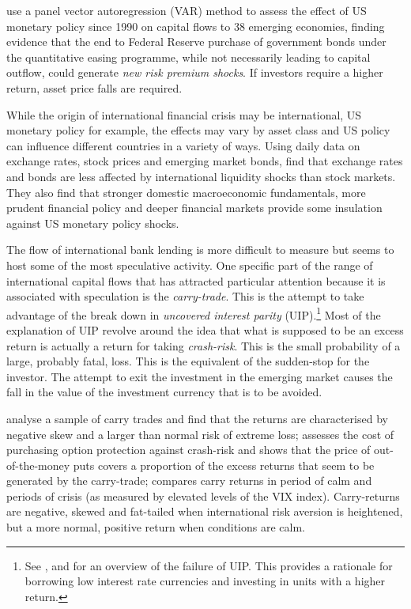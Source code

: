 \documentclass[12pt, a4paper, oneside]{article} %
\begin{document}
\citet{IMFLatam} use a panel vector autoregression (VAR) method to assess the effect of US monetary policy since 1990 on capital flows to 38 emerging economies, finding evidence that the end to Federal Reserve purchase of government bonds under the quantitative easing programme, while not necessarily leading to capital outflow, could generate \emph{new risk premium shocks}.   If investors require a higher return, asset price falls are required. 

While the origin of international financial crisis may be international, US monetary policy for example, the effects may vary by asset class and US policy can influence different countries in a variety of ways.  Using daily data on exchange rates, stock prices and emerging market bonds, \citet{Tapering} find that exchange rates and bonds are less affected by international liquidity shocks than stock markets.  They also find that stronger domestic macroeconomic fundamentals, more prudent financial policy and deeper financial markets provide some insulation against US monetary policy shocks.

The flow of international bank lending is more difficult to measure but seems to host some of the most speculative activity.  One specific part of the range of international capital flows that has attracted particular attention because it is associated with speculation is the \emph{carry-trade}.  This is the attempt to take advantage of the break down in \emph{uncovered interest parity} (UIP).\footnote{See \citet{fama1993common}, \citet{FrootFrankelFDB} and \citet{Hayward2013} for an overview of the failure of UIP.  This provides a rationale for borrowing low interest rate currencies and investing in units with a higher return.} Most of the explanation of UIP revolve around the idea that what is supposed to be an excess return is actually a return for taking \emph{crash-risk}.  This is the small probability of a large, probably fatal, loss. This is the equivalent of the sudden-stop for the investor. The attempt to exit the investment in the emerging market causes the fall in the value of the investment currency that is to be avoided. 

\citet{BrunnermeierCarry} analyse a sample of carry trades and find that the returns are characterised by negative skew and a larger than normal risk of extreme loss; \citet{JurekCrash} assesses the cost of purchasing option protection against crash-risk and shows that the price of out-of-the-money puts covers a proportion of the excess returns that seem to be generated by the carry-trade; \citet{Hayward2013} compares carry returns in period of calm and periods of crisis (as measured by elevated levels of the VIX index).  Carry-returns are negative, skewed and fat-tailed when international risk aversion is heightened, but a more normal, positive return when conditions are calm. 
\end{document}
